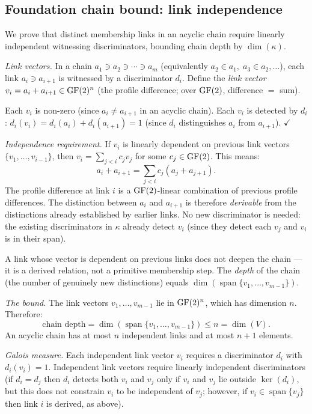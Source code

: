 \subsection{Foundation chain bound: link independence}
\label{app:chain-bound}

We prove that distinct membership links in an acyclic
chain require linearly independent witnessing
discriminators, bounding chain depth by $\dim(\kappa)$.

\emph{Link vectors.}
In a chain $a_1 \ni a_2 \ni \cdots \ni a_m$
(equivalently $a_2 \in a_1,\; a_3 \in a_2, \ldots$),
each link $a_i \ni a_{i+1}$ is witnessed by a
discriminator $d_i$. Define the \emph{link vector}
$v_i = a_i + a_{i+1} \in \operatorname{GF}(2)^n$ (the profile
difference; over $\operatorname{GF}(2)$, difference $=$ sum).

Each $v_i$ is non-zero (since $a_i \neq a_{i+1}$ in an
acyclic chain). Each $v_i$ is detected by $d_i$:
$d_i(v_i) = d_i(a_i) + d_i(a_{i+1}) = 1$ (since $d_i$
distinguishes $a_i$ from $a_{i+1}$). $\checkmark$

\emph{Independence requirement.}
If $v_i$ is linearly dependent on previous link vectors
$\{v_1, \ldots, v_{i-1}\}$, then
$v_i = \sum_{j < i} c_j v_j$ for some
$c_j \in \operatorname{GF}(2)$. This means:
\[
  a_i + a_{i+1} = \sum_{j < i} c_j (a_j + a_{j+1}).
\]
The profile difference at link $i$ is a $\operatorname{GF}(2)$-linear
combination of previous profile differences. The
distinction between $a_i$ and $a_{i+1}$ is therefore
\emph{derivable} from the distinctions already
established by earlier links. No new discriminator
is needed: the existing discriminators in $\kappa$
already detect $v_i$ (since they detect each $v_j$
and $v_i$ is in their span).

A link whose vector is dependent on previous links does
not deepen the chain --- it is a derived relation, not
a primitive membership step. The \emph{depth} of the
chain (the number of genuinely new distinctions) equals
$\dim(\operatorname{span}\{v_1, \ldots, v_{m-1}\})$.

\emph{The bound.}
The link vectors $v_1, \ldots, v_{m-1}$ lie in
$\operatorname{GF}(2)^n$, which has dimension $n$. Therefore:
\[
  \text{chain depth}
  = \dim(\operatorname{span}\{v_1, \ldots, v_{m-1}\})
  \leq n = \dim(V).
\]
An acyclic chain has at most $n$ independent links
and at most $n + 1$ elements.

\emph{Galois measure.}
Each independent link vector $v_i$ requires a
discriminator $d_i$ with $d_i(v_i) = 1$. Independent
link vectors require linearly independent discriminators
(if $d_i = d_j$ then $d_i$ detects both $v_i$ and $v_j$
only if $v_i$ and $v_j$ lie outside $\ker(d_i)$, but
this does not constrain $v_i$ to be independent of
$v_j$; however, if $v_i \in \operatorname{span}\{v_j\}$
then link $i$ is derived, as above).

